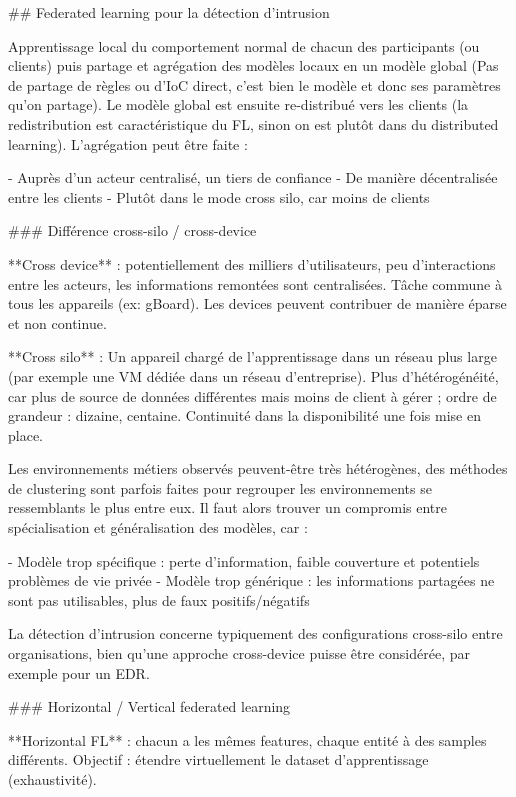 \documentclass{article}
\begin{document}
\begin{markdown}
## Federated learning pour la détection d'intrusion

Apprentissage local du comportement normal de chacun des participants (ou clients) puis partage et agrégation des modèles locaux en un modèle global (Pas de partage de règles ou d'IoC direct, c'est bien le modèle et donc ses paramètres qu'on partage).
Le modèle global est ensuite re-distribué vers les clients (la redistribution est caractéristique du FL, sinon on est plutôt dans du distributed learning).
L'agrégation peut être faite :

- Auprès d'un acteur centralisé, un tiers de confiance
- De manière décentralisée entre les clients
	- Plutôt dans le mode cross silo, car moins de clients

### Différence cross-silo / cross-device

**Cross device** : potentiellement des milliers d'utilisateurs, peu d'interactions entre les acteurs, les informations remontées sont centralisées. Tâche commune à tous les appareils (ex: gBoard). Les devices peuvent contribuer de manière éparse et non continue. 

**Cross silo** : Un appareil chargé de l'apprentissage dans un réseau plus large (par exemple une VM dédiée dans un réseau d'entreprise). Plus d'hétérogénéité, car plus de source de données différentes mais moins de client à gérer ; ordre de grandeur : dizaine, centaine. Continuité dans la disponibilité une fois mise en place. 

Les environnements métiers observés peuvent-être très hétérogènes, des méthodes de clustering sont parfois faites pour regrouper les environnements se ressemblants le plus entre eux. Il faut alors trouver un compromis entre spécialisation et généralisation des modèles, car :

- Modèle trop spécifique : perte d'information, faible couverture et potentiels problèmes de vie privée
- Modèle trop générique : les informations partagées ne sont pas utilisables, plus de faux positifs/négatifs

La détection d'intrusion concerne typiquement des configurations cross-silo entre organisations, bien qu'une approche cross-device puisse être considérée, par exemple pour un EDR.

### Horizontal / Vertical federated learning

**Horizontal FL** : chacun a les mêmes features, chaque entité à des samples différents.
Objectif : étendre virtuellement le dataset d'apprentissage (exhaustivité).


\end{markdown}
\end{document}
